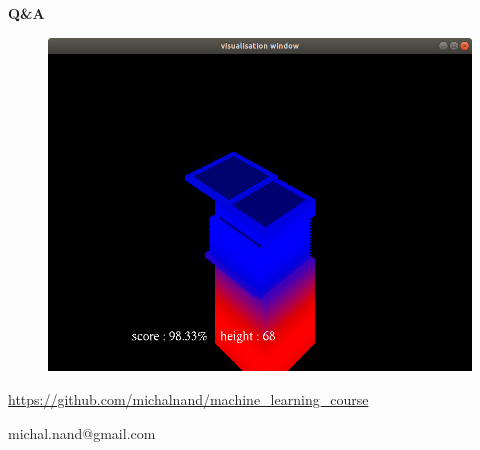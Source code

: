 \documentclass[xcolor=dvipsnames]{beamer}
\begin{document}
\begin{frame}{\bf Q\&A}


\begin{figure}[htbp]
  \includegraphics[scale=0.3]{final.png}
\end{figure}

\url{https://github.com/michalnand/machine\_learning\_course}

\centerline{michal.nand@gmail.com}

\end{frame}
\end{document}
